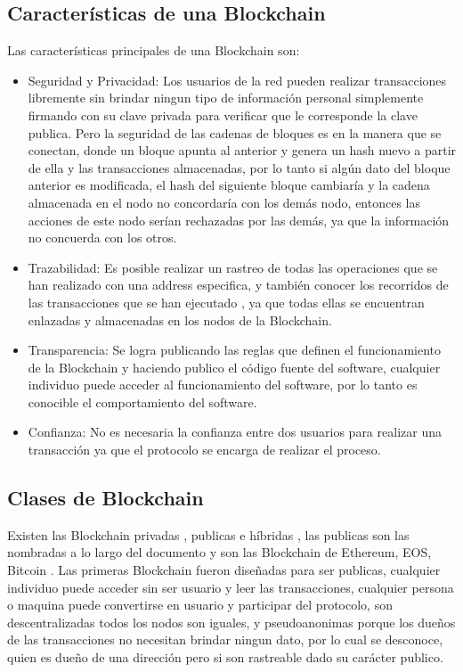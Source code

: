 \subsection{Características de una Blockchain}

Las características principales de una  Blockchain son:

\begin{itemize}
    \item Seguridad y Privacidad: Los usuarios de la red pueden realizar transacciones libremente sin brindar ningun tipo de información personal
    simplemente firmando con su clave privada para verificar que le corresponde la clave publica. Pero la seguridad de las cadenas de bloques es en la manera que
    se conectan, donde un bloque apunta al anterior y genera un hash nuevo a partir de ella y las transacciones almacenadas, por lo tanto si algún dato del 
    bloque anterior es modificada, el hash del siguiente bloque cambiaría y 
    la cadena almacenada en el nodo no concordaría con los demás nodo, entonces las acciones de este nodo serían rechazadas por las demás, 
    ya que la información no concuerda con los otros.  
    
    \item Trazabilidad: Es posible realizar un rastreo de todas las operaciones que se han realizado con una address especifica, y también conocer 
  los recorridos de las transacciones que se han ejecutado , ya que todas ellas se encuentran enlazadas y 
    almacenadas en los nodos de la Blockchain. 

    \item Transparencia: Se logra publicando las reglas que definen el funcionamiento de la  Blockchain y haciendo publico el código fuente
    del software, cualquier individuo puede acceder al funcionamiento del software, por lo tanto es conocible el comportamiento del software.
    \item Confianza: No es necesaria la confianza entre dos usuarios para realizar una transacción ya que el protocolo se encarga de realizar 
    el proceso.
    
    \end{itemize}

\subsection{Clases de Blockchain}
Existen las  Blockchain privadas , publicas e híbridas , las publicas son las nombradas a lo largo del documento y son las  Blockchain de Ethereum, EOS, Bitcoin 
. Las primeras  Blockchain fueron diseñadas para ser publicas, cualquier individuo puede acceder sin ser usuario y leer las transacciones, cualquier 
persona o maquina puede convertirse en usuario y participar del protocolo, son descentralizadas todos los nodos son iguales, y pseudoanonimas 
porque los dueños de las transacciones no necesitan brindar ningun dato, por lo cual se desconoce, quien es dueño de una dirección pero si son
rastreable dado su carácter publico. \cite[]{preukschat_Blockchain_2018}

